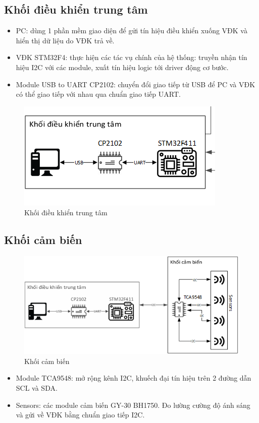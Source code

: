 \subsection{Khối điều khiển trung tâm}
\begin{itemize}
\item PC: dùng 1 phần mềm giao diện để gửi tín hiệu điều khiển xuống VĐK và hiển thị dữ liệu do VĐK trả về.
\item VĐK STM32F4: thực hiện các tác vụ chính của hệ thống: truyền nhận tín hiệu I2C với các module, xuất tín hiệu logic tới driver động cơ bước.
\item Module USB to UART CP2102: chuyển đổi giao tiếp từ USB để PC và VĐK có thể giao tiếp với nhau qua chuẩn giao tiếp UART.
\end{itemize}
\begin{figure}[htp]
	\centering
	\includegraphics[scale=1]{Chapters/Chapter5/Images/Khoidieukhientrungtam.png}
	\caption{Khối điều khiển trung tâm}
	\label{fig:C5central}
\end{figure}

\subsection{Khối cảm biến}
\begin{figure}[htp]
	\centering
	\includegraphics[scale=1]{Chapters/Chapter5/Images/KhoiSensor.png}
	\caption{Khối cảm biến}
	\label{fig:C5Sensor}
\end{figure}
\begin{itemize}
\item Module TCA9548: mở rộng kênh I2C, khuếch đại tín hiệu trên 2 đường dẫn SCL và SDA.
\item Sensors: các module cảm biến GY-30 BH1750. Đo lường cường độ ánh sáng và gửi về VĐK bằng chuẩn giao tiếp I2C.
\end{itemize}

